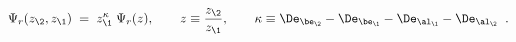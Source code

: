 \begin{equation}\label{scinv}
\Psi_r(z_\2,z_\1)\;=\;z_\1^{\kappa}\;\Psi_r(z), \qquad
z\equiv \frac{z_\2}{z_\1},\qquad\kappa\equiv\De_{\be_\2}-\De_{\be_\1}
-\De_{\al_\1}-\De_{\al_\2} \;\;.
\end{equation}

